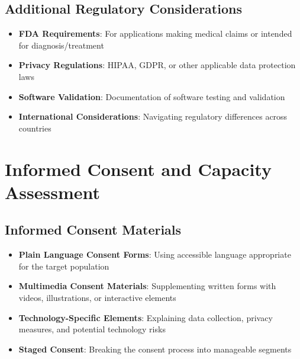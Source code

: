 \subsection{Additional Regulatory Considerations}
\begin{itemize}
    \item \textbf{FDA Requirements}: For applications making medical claims or intended for diagnosis/treatment
    
    \item \textbf{Privacy Regulations}: HIPAA, GDPR, or other applicable data protection laws
    
    \item \textbf{Software Validation}: Documentation of software testing and validation
    
    \item \textbf{International Considerations}: Navigating regulatory differences across countries
\end{itemize}

\section{Informed Consent and Capacity Assessment}
\subsection{Informed Consent Materials}
\begin{itemize}
    \item \textbf{Plain Language Consent Forms}: Using accessible language appropriate for the target population
    
    \item \textbf{Multimedia Consent Materials}: Supplementing written forms with videos, illustrations, or interactive elements
    
    \item \textbf{Technology-Specific Elements}: Explaining data collection, privacy measures, and potential technology risks
    
    \item \textbf{Staged Consent}: Breaking the consent process into manageable segments
\end{itemize}

